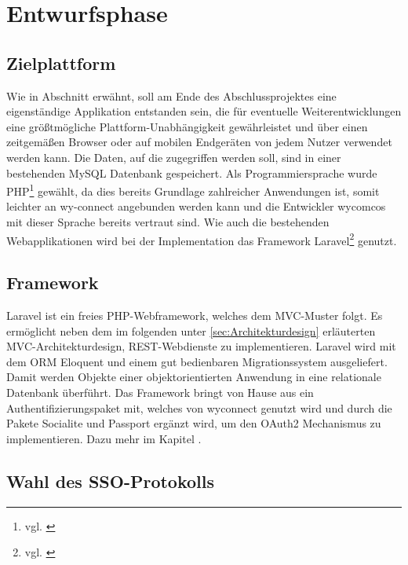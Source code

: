 \section{Entwurfsphase} 
\label{sec:Entwurfsphase}

\subsection{Zielplattform}
\label{sec:Zielplattform}

Wie in Abschnitt  erwähnt, soll am Ende des Abschlussprojektes eine eigenständige Applikation entstanden sein, die für eventuelle Weiterentwicklungen eine größtmögliche Plattform-Unabhängigkeit gewährleistet und über einen zeitgemäßen Browser oder auf mobilen Endgeräten von jedem Nutzer verwendet werden kann. 
Die Daten, auf die zugegriffen werden soll, sind in einer bestehenden MySQL Datenbank gespeichert. 
Als Programmiersprache wurde \ac{PHP}\footnote{vgl. \cite{PHP}} gewählt, da dies bereits Grundlage zahlreicher Anwendungen ist, somit leichter an wy-connect angebunden werden kann und die Entwickler wycomcos mit dieser Sprache bereits vertraut sind. 
Wie auch die bestehenden Webapplikationen wird bei der Implementation das Framework Laravel\footnote{vgl. \cite{Laravel}} genutzt.

\subsection{Framework}
\label{sec:Framework}

Laravel ist ein freies \ac{PHP}-Webframework, welches dem \ac{MVC}-Muster folgt. Es ermöglicht neben dem im folgenden unter \ref{sec:Architekturdesign} erläuterten MVC-Architekturdesign, \ac{REST}-Webdienste zu implementieren. Laravel wird mit dem \ac{ORM} Eloquent und einem gut bedienbaren Migrationssystem ausgeliefert. Damit werden Objekte einer objektorientierten Anwendung in eine relationale Datenbank überführt.
Das Framework bringt von Hause aus ein Authentifizierungspaket mit, welches von wyconnect genutzt wird und durch die Pakete Socialite und Passport ergänzt wird, um den OAuth2 Mechanismus zu implementieren. Dazu mehr im Kapitel .

\subsection{Wahl des SSO-Protokolls}
\label{sec:Protokollwahl}


